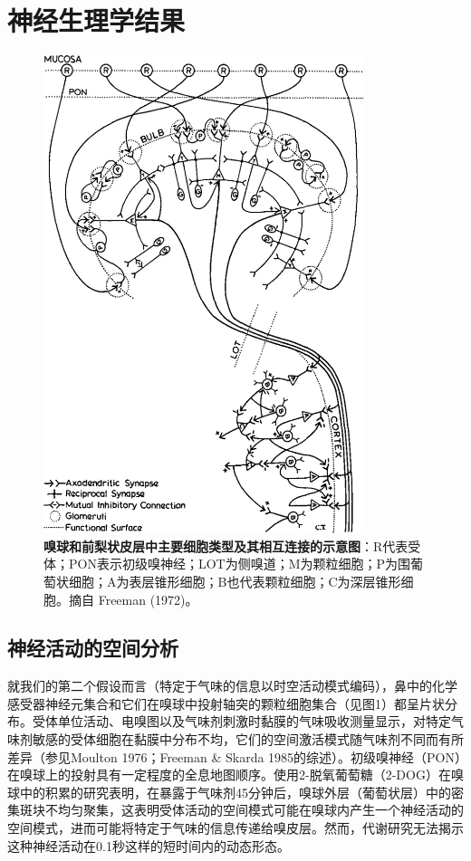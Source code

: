 \documentclass[a4paper,12pt]{article}
\newcommand{\longcaption}[2]{\caption[#1]{\textbf{#1}：#2}}
\begin{document}
\section{神经生理学结果}

\begin{figure}[ht]
    \centering
    \includegraphics[height=5.5in]{images/fig1.jpg}
    \longcaption{嗅球和前梨状皮层中主要细胞类型及其相互连接的示意图}{R代表受体；PON表示初级嗅神经；LOT为侧嗅道；M为颗粒细胞；P为围葡萄状细胞；A为表层锥形细胞；B也代表颗粒细胞；C为深层锥形细胞。摘自 Freeman (1972)。}
\end{figure}

\subsection{神经活动的空间分析}

就我们的第二个假设而言（特定于气味的信息以时空活动模式编码），鼻中的化学感受器神经元集合和它们在嗅球中投射轴突的颗粒细胞集合（见图1）都呈片状分布。受体单位活动、电嗅图以及气味剂刺激时黏膜的气味吸收测量显示，对特定气味剂敏感的受体细胞在黏膜中分布不均，它们的空间激活模式随气味剂不同而有所差异（参见Moulton 1976；Freeman \& Skarda 1985的综述）。初级嗅神经（PON）在嗅球上的投射具有一定程度的全息地图顺序。使用2-脱氧葡萄糖（2-DOG）在嗅球中的积累的研究表明，在暴露于气味剂45分钟后，嗅球外层（葡萄状层）中的密集斑块不均匀聚集，这表明受体活动的空间模式可能在嗅球内产生一个神经活动的空间模式，进而可能将特定于气味的信息传递给嗅皮层。然而，代谢研究无法揭示这种神经活动在0.1秒这样的短时间内的动态形态。
\end{document}
